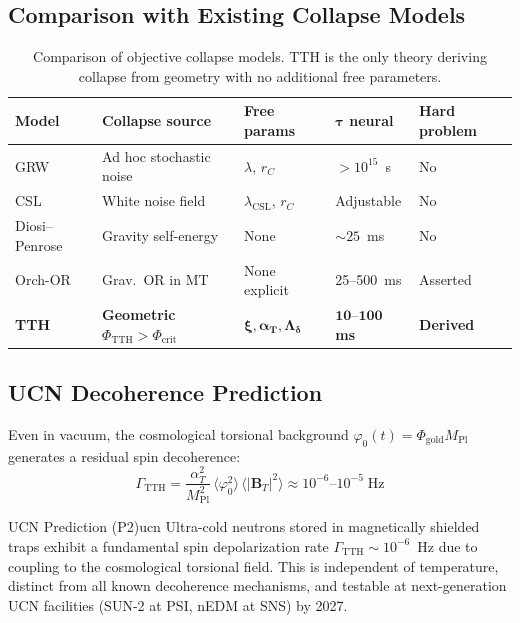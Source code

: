 \documentclass[12pt,a4paper]{article}
\newcommand{\MPl}{M_{\mathrm{Pl}}}
\renewcommand{\vev}[1]{\langle #1 \rangle}
\newcommand{\phicrit}{\Phi_{\mathrm{crit}}}
\newcommand{\phiTTH}{\Phi_{\mathrm{TTH}}}
\newcommand{\BT}{\mathbf{B}_T}
\newcommand{\alphaT}{\alpha_T}
\numberwithin{equation}{section}
\begin{document}
\subsection{Comparison with Existing Collapse Models}

\begin{table}[htbp]
\centering
\caption{Comparison of objective collapse models. TTH is the only theory
deriving collapse from geometry with no additional free parameters.}
\label{tab:collapse_comparison}
\begin{tabular}{lllll}
\toprule
\textbf{Model} & \textbf{Collapse source} & \textbf{Free params} & $\boldsymbol{\tau}$ \textbf{neural} & \textbf{Hard problem}\\
\midrule
GRW & Ad hoc stochastic noise & $\lambda$, $r_C$ & $>10^{15}$~s & No\\
CSL & White noise field & $\lambda_{\mathrm{CSL}}$, $r_C$ & Adjustable & No\\
Diosi--Penrose & Gravity self-energy & None & $\sim25$~ms & No\\
Orch-OR & Grav.\ OR in MT & None explicit & 25--500~ms & Asserted\\
\textbf{TTH} & \textbf{Geometric} $\phiTTH>\phicrit$ & $\boldsymbol{\xi,\alphaT,\Lambda_\delta}$ & $\boldsymbol{10\text{--}100}$\textbf{ ms} & \textbf{Derived}\\
\bottomrule
\end{tabular}
\end{table}

\subsection{UCN Decoherence Prediction}

Even in vacuum, the cosmological torsional background $\varphi_0(t) = \Phi_{\mathrm{gold}}\MPl$
generates a residual spin decoherence:
\begin{equation}
  \Gamma_{\mathrm{TTH}} = \frac{\alphaT^2}{\MPl^2}\,\vev{\varphi_0^2}\,\vev{|\BT|^2}
  \approx 10^{-6}\text{--}10^{-5}\;\mathrm{Hz}
  \label{eq:UCN}
\end{equation}

\begin{theorem}{UCN Prediction (P2)}{ucn}
Ultra-cold neutrons stored in magnetically shielded traps exhibit a fundamental
spin depolarization rate $\Gamma_{\mathrm{TTH}} \sim 10^{-6}$~Hz due to coupling to
the cosmological torsional field. This is independent of temperature,
distinct from all known decoherence mechanisms, and testable at
next-generation UCN facilities (SUN-2 at PSI, nEDM at SNS) by 2027.
\end{theorem}
\end{document}
